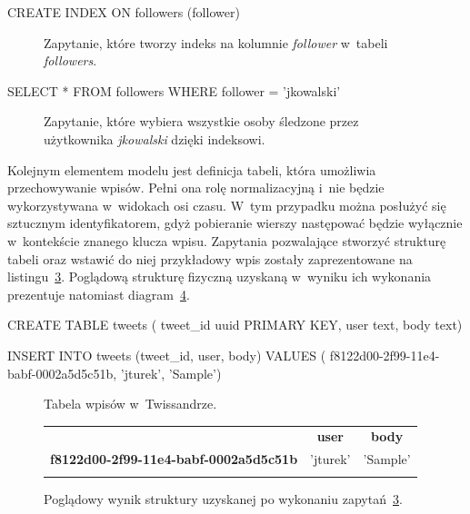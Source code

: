 \begin{verbbox}
	CREATE INDEX ON followers (follower)
\end{verbbox}

\begin{figure}[ht!]
	\centering
	\theverbbox
	\caption{Zapytanie, które tworzy indeks na kolumnie \emph{follower} w~tabeli \emph{followers}.}
	\label{lst:all_followed_by_jkowalski_index}
\end{figure}

\begin{verbbox}
	SELECT * FROM followers WHERE follower = 'jkowalski'
\end{verbbox}

\begin{figure}[ht!]
	\centering
	\theverbbox
	\caption{Zapytanie, które wybiera wszystkie osoby śledzone przez użytkownika \emph{jkowalski} dzięki indeksowi.}
	\label{lst:all_followed_by_jkowalski_select}
\end{figure}

Kolejnym elementem modelu jest definicja tabeli, która umożliwia przechowywanie wpisów. Pełni ona rolę normalizacyjną i~nie będzie wykorzystywana w~widokach osi czasu. W~tym przypadku można posłużyć się sztucznym identyfikatorem, gdyż pobieranie wierszy następować będzie wyłącznie w~kontekście znanego klucza wpisu. Zapytania pozwalające stworzyć strukturę tabeli oraz wstawić do niej przykładowy wpis zostały zaprezentowane na listingu~\ref{lst:tweets}. Poglądową strukturę fizyczną uzyskaną w~wyniku ich wykonania prezentuje natomiast diagram~\ref{tab:tweets_structure}.

\begin{verbbox}
CREATE TABLE tweets (
    tweet_id uuid PRIMARY KEY,
    user text,
    body text)

INSERT INTO tweets (tweet_id, user, body) VALUES (
    f8122d00-2f99-11e4-babf-0002a5d5c51b,
    'jturek',
    'Sample')
\end{verbbox}

\begin{figure}[ht!]
	\centering
	\theverbbox
	\caption{Tabela wpisów w~Twissandrze.}
	\label{lst:tweets}
\end{figure}

\begin{figure}[ht!]
	\centering
	\begin{tabular}{|l||c|c|}
		\hhline{|-||--|}
		& \textbf{user} & \textbf{body} \\
		\hhline{|~||==|}
		\textbf{f8122d00-2f99-11e4-babf-0002a5d5c51b} & 'jturek' & 'Sample' \\
		\hhline{|-||--|}
	\end{tabular} 

	\caption{Poglądowy wynik struktury uzyskanej po wykonaniu zapytań~\ref{lst:tweets}.}
	\label{tab:tweets_structure}
\end{figure}

